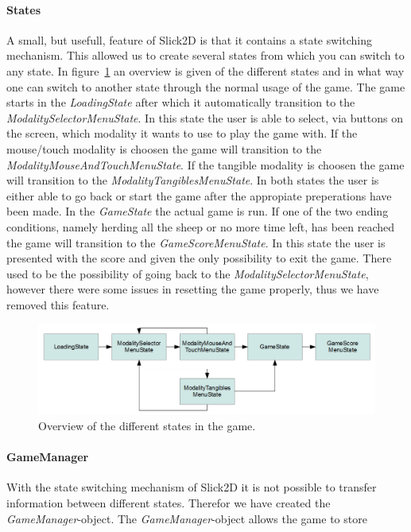 \documentclass[a4paper,10pt]{article}
\begin{document}
		\paragraph{States}
		A small, but usefull, feature of Slick2D is that it contains a state switching mechanism.
		This allowed us to create several states from which you can switch to any state.
		In figure~\ref{fig:game-state-diagram} an overview is given of the different states and in what way one can switch to another state through the normal usage of the game.
		The game starts in the \emph{LoadingState} after which it automatically transition to the \emph{ModalitySelectorMenuState}.
		In this state the user is able to select, via buttons on the screen, which modality it wants to use to play the game with.
		If the mouse/touch modality is choosen the game will transition to the \emph{ModalityMouseAndTouchMenuState}.
		If the tangible modality is choosen the game will transition to the \emph{ModalityTangiblesMenuState}.
		In both states the user is either able to go back or start the game after the appropiate preperations have been made.
		In the \emph{GameState} the actual game is run.
		If one of the two ending conditions, namely herding all the sheep or no more time left, has been reached the game will transition to the \emph{GameScoreMenuState}.
		In this state the user is presented with the score and given the only possibility to exit the game.
		There used to be the possibility of going back to the \emph{ModalitySelectorMenuState}, however there were some issues in resetting the game properly, thus we have removed this feature.
		
		\begin{figure}
			\includegraphics[width=\columnwidth]{images/game-state-diagram.png}
			\caption{Overview of the different states in the game.}
			\label{fig:game-state-diagram}
		\end{figure}
		
		\paragraph{GameManager}
		With the state switching mechanism of Slick2D it is not possible to transfer information between different states.
		Therefor we have created the \emph{GameManager}-object.
		The \emph{GameManager}-object allows the game to store 
		
\end{document}
